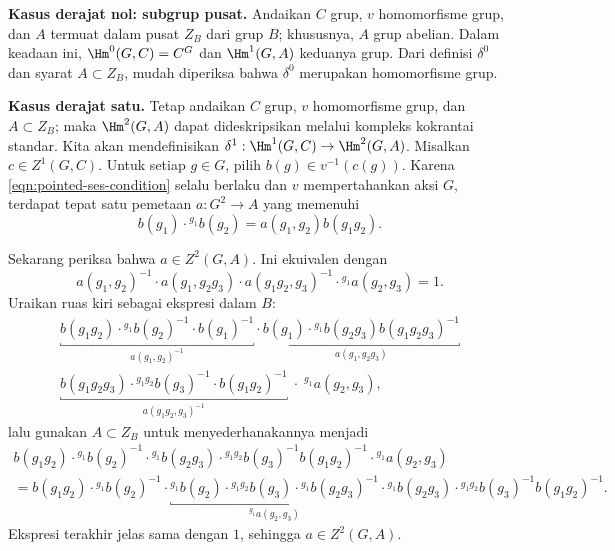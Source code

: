 \textbf{Kasus derajat nol: subgrup pusat.}\;
Andaikan $C$ grup, $v$ homomorfisme grup, dan $A$ termuat dalam pusat $Z_B$
dari grup $B$; khususnya, $A$ grup abelian. Dalam keadaan ini,
$\Hm^0(G,C)=C^G$ dan $\Hm^1(G,A)$ keduanya grup. Dari definisi $\delta^0$
dan syarat $A\subset Z_B$, mudah diperiksa bahwa $\delta^0$ merupakan
homomorfisme grup.

\textbf{Kasus derajat satu.}\;
Tetap andaikan $C$ grup, $v$ homomorfisme grup, dan $A\subset Z_B$; maka
$\Hm^2(G,A)$ dapat dideskripsikan melalui kompleks kokrantai standar. Kita
akan mendefinisikan $\delta^1:\Hm^1(G,C)\to\Hm^2(G,A)$. Misalkan
$c\in Z^1(G,C)$. Untuk setiap $g\in G$, pilih $b(g)\in v^{-1}(c(g))$.
Karena \eqref{eqn:pointed-ses-condition} selalu berlaku dan $v$
mempertahankan aksi $G$, terdapat tepat satu pemetaan $a:G^2\to A$ yang
memenuhi
\[ b(g_1) \cdot {}^{g_1} b(g_2) = a(g_1, g_2) b(g_1 g_2). \]

Sekarang periksa bahwa $a\in Z^2(G,A)$. Ini ekuivalen dengan
\[ a(g_1, g_2)^{-1} \cdot a(g_1, g_2 g_3) \cdot a(g_1 g_2, g_3)^{-1} \cdot {}^{g_1} a(g_2, g_3) = 1. \]
Uraikan ruas kiri sebagai ekspresi dalam $B$:
\begin{multline*}
	\underbracket{b(g_1 g_2) \cdot {}^{g_1} b(g_2)^{-1} \cdot b(g_1)^{-1}}_{a(g_1, g_2)^{-1}} \cdot \underbracket{b(g_1) \cdot {}^{g_1} b(g_2 g_3) b(g_1 g_2 g_3)^{-1}}_{a(g_1, g_2 g_3)} \\
	\underbracket{b(g_1 g_2 g_3) \cdot {}^{g_1 g_2} b(g_3)^{-1} \cdot b(g_1 g_2)^{-1}}_{a(g_1 g_2, g_3)^{-1}} \; \cdot \; {}^{g_1} a(g_2, g_3),
\end{multline*}
lalu gunakan $A\subset Z_B$ untuk menyederhanakannya menjadi
\begin{multline*}
	b(g_1 g_2) \cdot {}^{g_1} b(g_2)^{-1} \cdot {}^{g_1} b(g_2 g_3) \cdot {}^{g_1 g_2} b(g_3)^{-1}  b(g_1 g_2)^{-1} \cdot {}^{g_1} a(g_2, g_3) \\
	= b(g_1 g_2) \cdot {}^{g_1} b(g_2)^{-1} \cdot \underbracket{{}^{g_1} b(g_2) \cdot {}^{g_1 g_2} b(g_3) \cdot {}^{g_1} b(g_2 g_3)^{-1}}_{{}^{g_1} a(g_2, g_3)} \cdot {}^{g_1} b(g_2 g_3) \cdot {}^{g_1 g_2} b(g_3)^{-1}  b(g_1 g_2)^{-1} .
\end{multline*}
Ekspresi terakhir jelas sama dengan $1$, sehingga $a\in Z^2(G,A)$.

